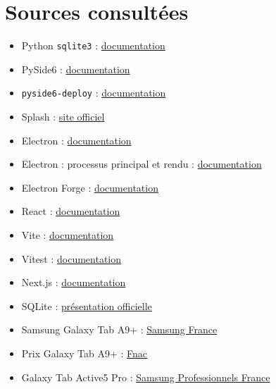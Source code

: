 \documentclass[11pt,a4paper]{article}
\newcommand{\source}[2]{\href{#2}{#1}}
\begin{document}
\clearpage
\section{Sources consultées}

{\footnotesize
\begin{multicols}{2}
\begin{itemize}[itemsep=0pt,topsep=0pt,leftmargin=4mm]
  \item Python \texttt{sqlite3} :
  \source{documentation}{https://docs.python.org/3/library/sqlite3.html}
  \item PySide6 :
  \source{documentation}{https://doc.qt.io/qtforpython-6/gettingstarted.html}
  \item \texttt{pyside6-deploy} :
  \source{documentation}{https://doc.qt.io/qtforpython-6/deployment/deployment-pyside6-deploy.html}
  \item Splash :
  \source{site officiel}{https://splash360.fr/}
  \item Electron :
  \source{documentation}{https://www.electronjs.org/docs/latest/tutorial/tutorial-prerequisites}
  \item Electron : processus principal et rendu :
  \source{documentation}{https://www.electronjs.org/docs/latest/tutorial/process-model}
  \item Electron Forge :
  \source{documentation}{https://www.electronforge.io/}
  \item React :
  \source{documentation}{https://react.dev/learn/build-a-react-app-from-scratch}
  \item Vite :
  \source{documentation}{https://vite.dev/guide/}
  \item Vitest :
  \source{documentation}{https://vitest.dev/guide/}
  \item Next.js :
  \source{documentation}{https://nextjs.org/docs}
  \item SQLite :
  \source{présentation officielle}{https://sqlite.org/about.html}
  \item Samsung Galaxy Tab A9+ :
  \source{Samsung France}{https://www.samsung.com/fr/tablets/galaxy-tab-a/galaxy-tab-a9-plus-wifi-graphite-128gb-sm-x210nzaeeub/}
  \item Prix Galaxy Tab A9+ :
  \source{Fnac}{https://www.fnac.com/Tablette-Tactile-Samsung-Galaxy-Tab-A9-11-Wifi-128-Go-Anthracite/a21688745/w-4}
  \item Galaxy Tab Active5 Pro :
  \source{Samsung Professionnels France}{https://www.samsung.com/fr/business/tablets/galaxy-tab-active/galaxy-tab-active5-pro-enterprise-edition-sm-x356bzgaeeb/}

\end{itemize}
\end{multicols}}
\end{document}
